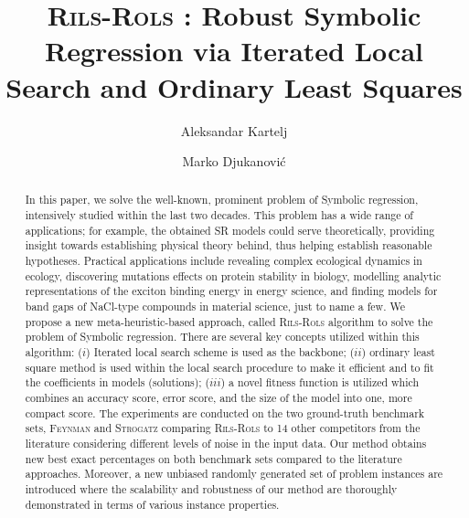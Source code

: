 \documentclass[a4paper,12pt]{elsarticle}
\begin{document}
	
	
	\title{\textsc{Rils}-\textsc{Rols} : Robust Symbolic Regression via Iterated Local Search and Ordinary Least Squares}
	
	\author[1]{Aleksandar Kartelj}
	\author[2]{Marko Djukanovi\'c}
	\address[1]{$kartelj@matf.bg.ac.rs$, \\  Faculty of Mathematics, University of Belgrade, Serbia}
	\address[2]{$ marko.djukanovic@pmf.unibl.org$,\\   Faculty of Natural Sciences and Mathematics, University of Banja Luka, Bosnia and Herzegovina}
	\begin{abstract}
		In this paper, we solve the well-known, prominent problem of Symbolic regression, intensively studied within the last two decades. This problem has a wide range of applications;  for example, the obtained SR models could serve theoretically, providing insight towards establishing physical theory behind, thus helping establish reasonable hypotheses.  Practical applications include revealing complex ecological dynamics in ecology, discovering mutations effects on protein stability in biology, modelling analytic representations of the exciton binding energy in energy science, and finding models for band gaps of NaCl-type compounds
		in material science, just to name a few. We propose a new meta-heuristic-based approach, called \textsc{Rils}-\textsc{Rols} algorithm to solve the problem of Symbolic regression. There are several key concepts utilized within this algorithm: ($i$) Iterated local search scheme is used as the backbone; ($ii$) ordinary least square method is used within the local search procedure to make it efficient and to fit the coefficients in models (solutions);  ($iii$) a novel fitness function is utilized which combines an accuracy score, error score, and the size of the model into one, more compact score. The experiments are conducted on the two ground-truth benchmark sets, \textsc{Feynman} and \textsc{Strogatz} comparing \textsc{Rils}-\textsc{Rols} to 14 other competitors from the literature considering different levels of noise in the input data.  Our method obtains new best exact percentages on both benchmark sets compared to the literature approaches. Moreover, a new unbiased randomly generated set of problem instances are introduced where the scalability and robustness of our method are thoroughly demonstrated in terms of various instance properties. 
	\end{abstract}
	\maketitle
	
\end{document}
